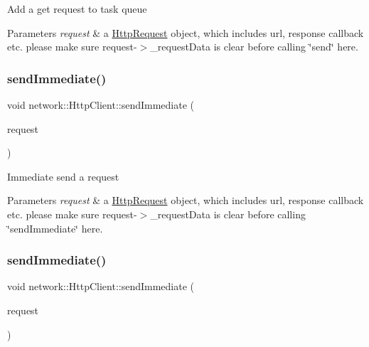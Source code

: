 Add a get request to task queue


\begin{DoxyParams}{Parameters}
{\em request} & a \hyperlink{classnetwork_1_1HttpRequest}{Http\+Request} object, which includes url, response callback etc. please make sure request-\/$>$\+\_\+request\+Data is clear before calling \char`\"{}send\char`\"{} here. \\
\hline
\end{DoxyParams}
\mbox{\label{classnetwork_1_1HttpClient_a1a8920937cbbbcdc17f64ad431ac9c63}} 
\subsubsection{\texorpdfstring{send\+Immediate()}{sendImmediate()}\hspace{0.1cm}{\footnotesize\ttfamily [1/2]}}
{\footnotesize\ttfamily void network\+::\+Http\+Client\+::send\+Immediate (\begin{DoxyParamCaption}\item[{\hyperlink{classnetwork_1_1HttpRequest}{Http\+Request} $\ast$}]{request }\end{DoxyParamCaption})}

Immediate send a request


\begin{DoxyParams}{Parameters}
{\em request} & a \hyperlink{classnetwork_1_1HttpRequest}{Http\+Request} object, which includes url, response callback etc. please make sure request-\/$>$\+\_\+request\+Data is clear before calling \char`\"{}send\+Immediate\char`\"{} here. \\
\hline
\end{DoxyParams}
\mbox{\label{classnetwork_1_1HttpClient_a1a8920937cbbbcdc17f64ad431ac9c63}} 
\subsubsection{\texorpdfstring{send\+Immediate()}{sendImmediate()}\hspace{0.1cm}{\footnotesize\ttfamily [2/2]}}
{\footnotesize\ttfamily void network\+::\+Http\+Client\+::send\+Immediate (\begin{DoxyParamCaption}\item[{\hyperlink{classnetwork_1_1HttpRequest}{Http\+Request} $\ast$}]{request }\end{DoxyParamCaption})}

